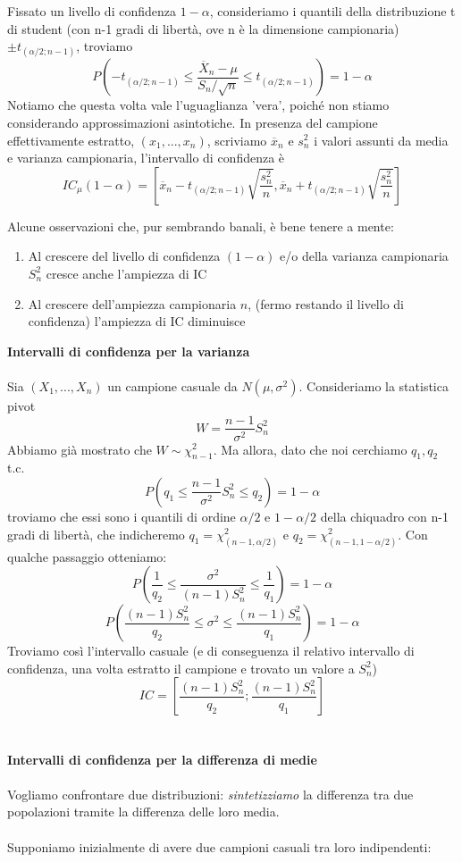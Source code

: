 Fissato un livello di confidenza $1-\alpha$, consideriamo i quantili della distribuzione t di student (con n-1 gradi di libertà, ove n è la dimensione campionaria) 
$\pm t_{(\alpha/2;n-1)}$, 
troviamo $$ P\left(-t_{(\alpha/2;n-1)} \leq \frac{\overline{X}_n - \mu}{S_n / \sqrt{n}}
 \leq t_{(\alpha/2;n-1)}\right) = 1 - \alpha $$
Notiamo che questa volta vale l'uguaglianza 'vera', poiché non stiamo considerando approssimazioni asintotiche. 
In presenza del campione effettivamente estratto, $(x_1,...,x_n)$, 
scriviamo $\overline{x}_n$ e $s^2_n$ i valori assunti da media e varianza campionaria,
l'intervallo di confidenza è $$IC_{\mu}(1-\alpha)=
\left[\overline{x}_n -
 t_{(\alpha / 2;n-1)} 
 \sqrt{\frac{s^2_n}{n}},
  \overline{x}_n + t_{(\alpha / 2;n-1)}\sqrt{\frac{s^2_n}{n}}\right]$$
\begin{oss}
Alcune osservazioni che, pur sembrando banali, è bene tenere a mente:
\begin{enumerate}
\item Al crescere del livello di confidenza $(1-\alpha)$ e/o della varianza campionaria $S^2_n$ cresce anche l'ampiezza di IC
\item Al crescere dell'ampiezza campionaria $n$, (fermo restando il livello di confidenza) l'ampiezza di IC diminuisce
\end{enumerate}
\end{oss}

\noindent\textbf{Intervalli di confidenza per la varianza}
\\ \\
Sia $(X_1,...,X_n)$ un campione casuale da $N(\mu,\sigma^2)$.
Consideriamo la statistica pivot $$W=\frac{n-1}{\sigma^2} S^2_n$$ Abbiamo già mostrato che $W \sim \chi^2_{n-1}$. 
Ma allora, dato che noi cerchiamo $q_1,q_2$ t.c. 
$$P \left( q_1 \leq \frac{n-1}{\sigma^2} S^2_n \leq q_2 \right) =1-\alpha$$ 
troviamo che essi sono i quantili di ordine $\alpha / 2$ e $1 - \alpha / 2$ della chiquadro con n-1 gradi di libertà, che indicheremo $q_1=\chi^2_{(n-1,\alpha / 2)}$ e $q_2=\chi^2_{(n-1,1 - \alpha / 2)}$.
Con qualche passaggio otteniamo:
$$P \left( \frac{1}{q_2} \leq \frac{\sigma^2}{(n-1) S^2_n} \leq \frac{1}{q_1} \right) =1-\alpha$$
$$P \left( \frac{(n-1) S^2_n}{q_2} \leq \sigma^2 \leq \frac{(n-1) S^2_n}{q_1} \right) =1-\alpha$$
Troviamo così l'intervallo casuale (e di conseguenza il relativo intervallo di confidenza, una volta estratto il campione e trovato un valore a $S^2_n$) $$IC=\left[ \frac{(n-1)S^2_n}{q_2};\frac{(n-1)S^2_n}{q_1} \right]$$
\\ \\
\noindent\textbf{Intervalli di confidenza per la differenza di medie}
\\ \\
Vogliamo confrontare due distribuzioni: \textit{sintetizziamo} la differenza tra due popolazioni tramite la differenza delle loro media. \\ \\
Supponiamo inizialmente di avere due campioni casuali tra loro indipendenti: 

